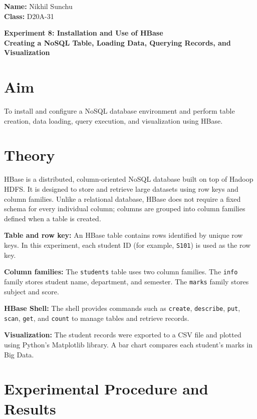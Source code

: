 \documentclass[11pt,a4paper]{article}
\begin{document}
\noindent
\textbf{Name:} Nikhil Sunchu\\
\textbf{Class:} D20A-31

\vspace{0.5em}
\begin{center}
{\Large\bfseries Experiment 8: Installation and Use of HBase}\\
\textbf{Creating a NoSQL Table, Loading Data, Querying Records, and Visualization}
\end{center}

\section*{Aim}
To install and configure a NoSQL database environment and perform table creation, data loading, query execution, and visualization using HBase.

\section{Theory}
HBase is a distributed, column-oriented NoSQL database built on top of Hadoop HDFS. It is designed to store and retrieve large datasets using row keys and column families. Unlike a relational database, HBase does not require a fixed schema for every individual column; columns are grouped into column families defined when a table is created.

\textbf{Table and row key:} An HBase table contains rows identified by unique row keys. In this experiment, each student ID (for example, \texttt{S101}) is used as the row key.

\textbf{Column families:} The \texttt{students} table uses two column families. The \texttt{info} family stores student name, department, and semester. The \texttt{marks} family stores subject and score.

\textbf{HBase Shell:} The shell provides commands such as \texttt{create}, \texttt{describe}, \texttt{put}, \texttt{scan}, \texttt{get}, and \texttt{count} to manage tables and retrieve records.

\textbf{Visualization:} The student records were exported to a CSV file and plotted using Python's Matplotlib library. A bar chart compares each student's marks in Big Data.

\section{Experimental Procedure and Results}
\end{document}
